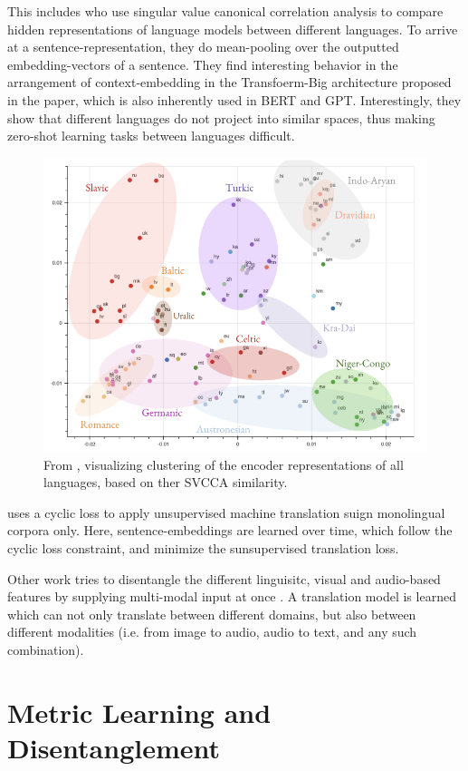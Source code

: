 \documentclass[a4paper,12pt,twoside,openright]{report}
\begin{document}
This includes \cite{kudugunta18} who use singular value canonical correlation analysis to compare hidden representations of language models between different languages.
To arrive at a sentence-representation, they do mean-pooling over the outputted embedding-vectors of a sentence. 
They find interesting behavior in the arrangement of context-embedding in the Transfoerm-Big architecture proposed in the \cite{vaswani17} paper, which is also inherently used in BERT and GPT.
Interestingly, they show that different languages do not project into similar spaces, thus making zero-shot learning tasks between languages difficult.


\begin{figure}[h]
	\center
  \includegraphics[width=0.6\linewidth]{./assets/relatedwork/embeddings_by_language.png}
  \caption{From \cite{kudugunta18}, visualizing clustering of the encoder representations of all languages, based on ther SVCCA similarity.}
  \label{fig:embeddings_by_language}
\end{figure}



\cite{lample18} uses a cyclic loss to apply unsupervised machine translation suign monolingual corpora only. 
Here, sentence-embeddings are learned over time, which follow the cyclic loss constraint, and minimize the sunsupervised translation loss.

Other work tries to disentangle the different linguisitc, visual and audio-based features by supplying multi-modal input at once \cite{ma19}.
A translation model is learned which can not only translate between different domains, but also between different modalities (i.e. from image to audio, audio to text, and any such combination).



\section{Metric Learning and Disentanglement}
\end{document}
